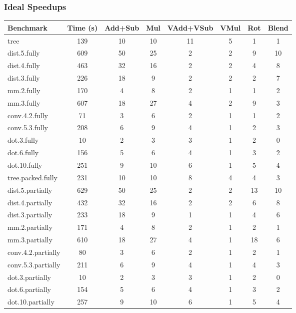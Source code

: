 
\subsubsection*{Ideal Speedups}
\begin{table}
    \begin{tabular}{lccccccc}
    \toprule
    Benchmark & Time (s) & Add+Sub & Mul & VAdd+VSub & VMul & Rot & Blend\\\midrule
    tree & 139 & 10 & 10 & 11 & 5 & 1 & 1\\
    dist.5.fully & 609 & 50 & 25 & 2 & 2 & 9 & 10\\
    dist.4.fully & 463 & 32 & 16 & 2 & 2 & 4 & 8\\
    dist.3.fully & 226 & 18 & 9 & 2 & 2 & 2 & 7\\
    mm.2.fully & 170 & 4 & 8 & 2 & 1 & 1 & 2\\
    mm.3.fully & 607 & 18 & 27 & 4 & 2 & 9 & 3\\
    conv.4.2.fully & 71 & 3 & 6 & 2 & 1 & 1 & 2\\
    conv.5.3.fully & 208 & 6 & 9 & 4 & 1 & 2 & 3\\
    dot.3.fully & 10 & 2 & 3 & 3 & 1 & 2 & 0\\
    dot.6.fully & 156 & 5 & 6 & 4 & 1 & 3 & 2\\
    dot.10.fully & 251 & 9 & 10 & 6 & 1 & 5 & 4\\
    tree.packed.fully & 231 & 10 & 10 & 8 & 4 & 4 & 3\\
    dist.5.partially & 629 & 50 & 25 & 2 & 2 & 13 & 10\\
    dist.4.partially & 432 & 32 & 16 & 2 & 2 & 6 & 8\\
    dist.3.partially & 233 & 18 & 9 & 1 & 1 & 4 & 6\\
    mm.2.partially & 171 & 4 & 8 & 2 & 1 & 2 & 1\\
    mm.3.partially & 610 & 18 & 27 & 4 & 1 & 18 & 6\\
    conv.4.2.partially & 80 & 3 & 6 & 2 & 1 & 2 & 1\\
    conv.5.3.partially & 211 & 6 & 9 & 4 & 1 & 4 & 3\\
    dot.3.partially & 10 & 2 & 3 & 3 & 1 & 2 & 0\\
    dot.6.partially & 154 & 5 & 6 & 4 & 1 & 3 & 2\\
    dot.10.partially & 257 & 9 & 10 & 6 & 1 & 5 & 4\\

\end{tabular}
\end{table}
